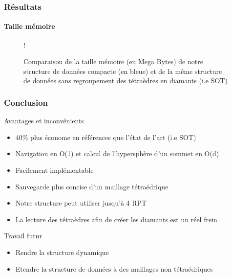 \documentclass[9pt]{beamer}
\begin{document}
\begin{frame}
\frametitle{Résultats}
\framesubtitle{Taille mémoire}
\begin{figure}[H]
\centering
{} {!}{
\pgfplotsset{width=13cm,height=7cm}
}
\caption{Comparaison de la taille mémoire (en Mega Bytes) de notre structure de données compacte (en bleue) et de la même structure de données sans regroupement des tétraèdres en diamants (i.e SOT)}
\label{fig:taille_memoire}
\end{figure}
\end{frame}

\begin{frame}
\frametitle{Conclusion}
\begin{block}{Avantages et inconvénients}
\begin{itemize}
\color{blue}
\item 40\% plus économe en références que l'état de l'art (i.e SOT)
\item Navigation en O(1) et calcul de l'hypersphère d'un sommet en O(d)
\item Facilement implémentable
\item Sauvegarde plus concise d'un maillage tétraédrique
\color{red}
\item Notre structure peut utiliser jusqu'à 4 RPT
\item La lecture des tétraèdres afin de créer les diamants est un réel frein
\end{itemize}
\color{blue}
\end{block}
\begin{block}{Travail futur}
\begin{itemize}
\item Rendre la structure dynamique
\item Etendre la structure de données à des maillages non tétraédriques
\end{itemize}
\end{block}
\end{frame}
\end{document}
